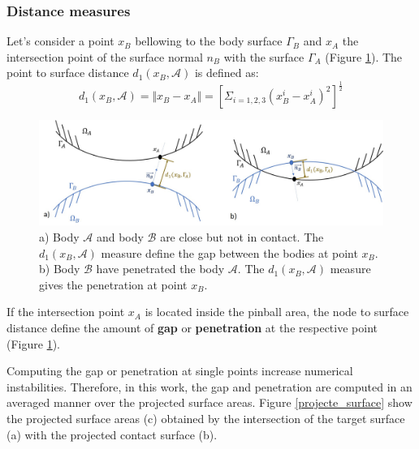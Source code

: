  \subsubsection*{Distance measures} 
  Let's consider a point $x_B$ bellowing to the body surface $\Gamma_B$ and $x_A$ the intersection point of the surface normal $n_B$ with the surface $\Gamma_A$ (Figure \ref{gap_penetration}). The point to surface distance $d_1(x_B,\mathcal{A})$  is defined as:
\begin{equation}
\label{normalContactdistance}
d_1(x_B,\mathcal{A}) = \Vert x_B-x_A \Vert = \left[  \Sigma_{i={1,2,3}}\left( x_B^i - x_A^i \right)^2\right]^{\frac{1}{2}}
\end{equation}

 \begin{center}
\begin{figure}
\centerline{\includegraphics[width=1\textwidth,keepaspectratio]{figures/gap_penetration.jpg} }
\caption{  a) Body $\mathcal{A}$ and body $\mathcal{B}$  are close but not in contact. The  $d_1(x_B,\mathcal{A})$ measure define the gap between the bodies at point $x_B$.  b) Body $\mathcal{B}$ have penetrated the body $\mathcal{A}$. The $d_1(x_B,\mathcal{A})$ measure gives the penetration at point $x_B$.}
\label{gap_penetration}
\end{figure}
\end{center}

If the intersection point $x_A$ is located inside the pinball area, the node to surface distance define the amount of \textbf{gap} or \textbf{penetration} at the respective point (Figure \ref{gap_penetration}).
 
Computing the gap or penetration at single points increase numerical instabilities.  Therefore, in this work, the gap and penetration are computed in an averaged manner over the projected surface areas. Figure \ref{projecte_surface} show the projected surface areas (c) obtained by the intersection of the target surface (a) with the projected contact surface (b). 

